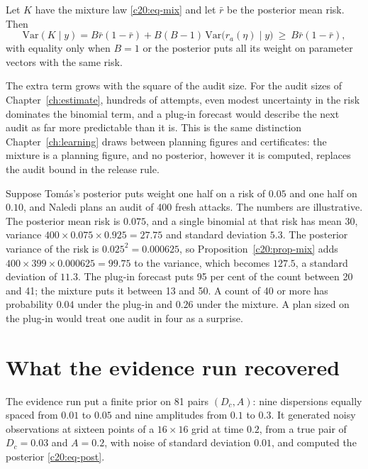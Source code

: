 \begin{proposition}\label{c20:prop-mix}
Let $K$ have the mixture law \eqref{c20:eq-mix} and let $\bar r$ be the posterior mean risk. Then
\[\mathrm{Var}(K\mid y)=B\bar r(1-\bar r)+B(B-1)\,\mathrm{Var}\big(r_a(\eta)\mid y\big)\ \ge\ B\bar r(1-\bar r),\]
with equality only when $B=1$ or the posterior puts all its weight on parameter vectors with the
same risk.
\end{proposition}

The extra term grows with the square of the audit size. For the audit sizes of Chapter~\ref{ch:estimate},
hundreds of attempts, even modest uncertainty in the risk dominates the binomial term, and
a plug-in forecast would describe the next audit as far more predictable than it is. This is the
same distinction Chapter~\ref{ch:learning} draws between planning figures and certificates: the mixture is
a planning figure, and no posterior, however it is computed, replaces the audit bound in the
release rule.

\begin{example}\label{c20:ex-plan}
Suppose Tom\'as's posterior puts weight one
half on a risk of $0.05$ and one half on $0.10$, and Naledi plans an audit of 400 fresh attacks. The
numbers are illustrative. The posterior mean risk is $0.075$, and a single binomial at that risk
has mean 30, variance $400\times0.075\times0.925=27.75$ and standard deviation $5.3$. The posterior
variance of the risk is $0.025^2=0.000625$, so Proposition~\ref{c20:prop-mix} adds $400\times399\times0.000625=99.75$ to the variance, which becomes $127.5$, a standard deviation of $11.3$. The plug-in forecast
puts 95 per cent of the count between 20 and 41; the mixture puts it between 13 and 50. A
count of 40 or more has probability $0.04$ under the plug-in and $0.26$ under the mixture. A
plan sized on the plug-in would treat one audit in four as a surprise.
\end{example}

\section{What the evidence run recovered}\label{c20:sec-recovered}

The evidence run put a finite prior on 81 pairs $(D_c,A)$: nine dispersions equally spaced from
$0.01$ to $0.05$ and nine amplitudes from $0.1$ to $0.3$. It generated noisy observations at sixteen
points of a $16\times16$ grid at time $0.2$, from a true pair of $D_c=0.03$ and $A=0.2$, with noise of
standard deviation $0.01$, and computed the posterior \eqref{c20:eq-post}.

